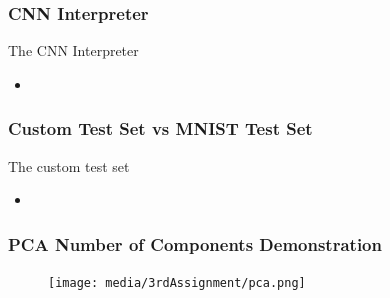\begin{frame}
    \frametitle{CNN Interpreter}
    The CNN Interpreter 
    \begin{itemize}
        \item 
    \end{itemize}
\end{frame}

\begin{frame}
    \frametitle{Custom Test Set vs MNIST Test Set}
    The custom test set 
    \begin{itemize}
        \item 
    \end{itemize}
\end{frame}

\begin{frame}
    \frametitle{PCA Number of Components Demonstration}
    \begin{figure}
        \centering
        \texttt{[image: media/3rdAssignment/pca.png]}
    \end{figure}
\end{frame}